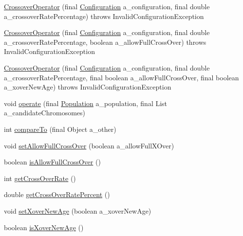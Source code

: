 \begin{DoxyCompactItemize}
\item 
\hyperlink{classorg_1_1jgap_1_1impl_1_1_crossover_operator_a4affbff4c1ad04ca1b2b9b8d276949c1}{Crossover\-Operator} (final \hyperlink{classorg_1_1jgap_1_1_configuration}{Configuration} a\-\_\-configuration, final double a\-\_\-crossover\-Rate\-Percentage)  throws Invalid\-Configuration\-Exception 
\item 
\hyperlink{classorg_1_1jgap_1_1impl_1_1_crossover_operator_a2216a6251f7bd64b1270ac55ed9d1256}{Crossover\-Operator} (final \hyperlink{classorg_1_1jgap_1_1_configuration}{Configuration} a\-\_\-configuration, final double a\-\_\-crossover\-Rate\-Percentage, boolean a\-\_\-allow\-Full\-Cross\-Over)  throws Invalid\-Configuration\-Exception 
\item 
\hyperlink{classorg_1_1jgap_1_1impl_1_1_crossover_operator_a7ca6733e4e742ee2e3f5f7628beb7614}{Crossover\-Operator} (final \hyperlink{classorg_1_1jgap_1_1_configuration}{Configuration} a\-\_\-configuration, final double a\-\_\-crossover\-Rate\-Percentage, final boolean a\-\_\-allow\-Full\-Cross\-Over, final boolean a\-\_\-xover\-New\-Age)  throws Invalid\-Configuration\-Exception 
\item 
void \hyperlink{classorg_1_1jgap_1_1impl_1_1_crossover_operator_a271b82e98b398a42b576c956350d905e}{operate} (final \hyperlink{classorg_1_1jgap_1_1_population}{Population} a\-\_\-population, final List a\-\_\-candidate\-Chromosomes)
\item 
int \hyperlink{classorg_1_1jgap_1_1impl_1_1_crossover_operator_a13ba59ced7b3bfd8b7f9433756664726}{compare\-To} (final Object a\-\_\-other)
\item 
void \hyperlink{classorg_1_1jgap_1_1impl_1_1_crossover_operator_aefa1ab099925469046f4a3777f9fe61f}{set\-Allow\-Full\-Cross\-Over} (boolean a\-\_\-allow\-Full\-X\-Over)
\item 
boolean \hyperlink{classorg_1_1jgap_1_1impl_1_1_crossover_operator_a51faa8e8996095443a18c617768cd01f}{is\-Allow\-Full\-Cross\-Over} ()
\item 
int \hyperlink{classorg_1_1jgap_1_1impl_1_1_crossover_operator_a4152e74d59787d7f2a892b9f90e8340d}{get\-Cross\-Over\-Rate} ()
\item 
double \hyperlink{classorg_1_1jgap_1_1impl_1_1_crossover_operator_a3a23b88eca25371ff8429d0fedf1c8b8}{get\-Cross\-Over\-Rate\-Percent} ()
\item 
void \hyperlink{classorg_1_1jgap_1_1impl_1_1_crossover_operator_af5444671de9ac65f400d401d5b649170}{set\-Xover\-New\-Age} (boolean a\-\_\-xover\-New\-Age)
\item 
boolean \hyperlink{classorg_1_1jgap_1_1impl_1_1_crossover_operator_af27944540a7f2bc7beef78da63445f10}{is\-Xover\-New\-Age} ()
\end{DoxyCompactItemize}
